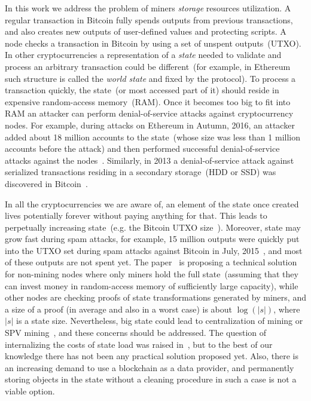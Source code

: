\documentclass[]{llncs}   %
\begin{document}
In this work we address the problem of miners {\em storage} resources utilization.
A regular transaction in Bitcoin fully spends outputs from previous transactions, and
also creates new outputs of user-defined values and protecting scripts.
A node checks a transaction in
Bitcoin by using a set of unspent outputs~(UTXO). In other cryptocurrencies a
representation of a {\em state} needed to validate and process an arbitrary
transaction could be different~(for example, in Ethereum~\cite{ethyp} such
structure is called the {\em world state} and fixed by the protocol). To process
a transaction quickly, the state~(or most accessed part of it) should reside in
expensive random-access memory~(RAM). Once it becomes too big to fit into RAM an attacker can
perform denial-of-service attacks against cryptocurrency nodes. For example,
during attacks on Ethereum in Autumn, 2016, an attacker added about 18 million
accounts to the state~(whose size was less than 1 million accounts before the
attack) and then performed successful denial-of-service attacks against the
nodes~\cite{eth2016dos}. Similarly, in 2013 a denial-of-service attack against
serialized transactions residing in a secondary storage~(HDD or SSD) was
discovered in Bitcoin~\cite{vasek2014empirical}.

In all the cryptocurrencies we are aware of, an element of the state once created
lives potentially forever without paying anything for that. This leads to perpetually increasing
state~(e.g. the Bitcoin UTXO size~\cite{utxoChart}). Moreover, state may grow fast during spam attacks, for
example, 15 million outputs were quickly put into the UTXO set during spam attacks
against Bitcoin in July, 2015~\cite{bitcoin2015flood}, and most of these outputs
are not spent yet. The paper~\cite{reyzin2016improving} is proposing a technical
solution for non-mining nodes where only miners hold the full state~(assuming
that they can invest money in random-access memory of sufficiently large
capacity), while other nodes are checking proofs of state transformations
generated by miners, and a size of a proof (in average and also in a worst case)
is about $\log(|s|)$, where $|s|$ is a state size. Nevertheless, big state
could lead to centralization of mining or SPV mining~\cite{spvMining}, and these
concerns should be addressed. The question of internalizing the costs of
state load was raised in~\cite{Moeser2015}, but to the best of our knowledge there has not been any
practical solution proposed yet. Also, there is an increasing demand to use a
blockchain as a data provider, and permanently storing objects in the state
without a cleaning procedure in such a case is not a viable option.
\end{document}
